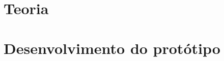 \documentclass[
	12pt,				%
	openright,			%
	twoside,			%
	a4paper,			%
	english,			%
	brazil				%
	]{abntex2}
\begin{document}
\listoffigures*
\cleardoublepage



\tableofcontents*
\cleardoublepage

\textual







\part{Teoria}


\part{Desenvolvimento do protótipo}









%
%





\end{document}
